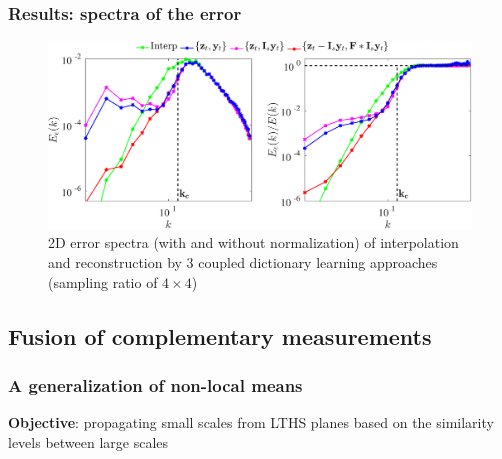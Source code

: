 \documentclass{beamer}
\begin{document}
\begin{frame}
	\frametitle{Results: spectra of the error} 

	\begin{figure}
		\centering
		\includegraphics[width=\textwidth]{./figures/DL/errspectra2d_nonnormalized_normalized_timespacing_06_spacespacing_04.eps}
		\caption*{2D error spectra (with and without normalization) of interpolation and reconstruction by 3 coupled dictionary learning approaches (sampling ratio of $ 4 \times 4 $)}
	\end{figure}
\end{frame}

\subsection{Fusion of complementary measurements}		
\begin{frame}
\frametitle{A generalization of non-local means}	
	\begin{tcolorbox}[colback=red!5!white,colframe=red!75!black]	
		\textbf{Objective}: propagating small scales from LTHS planes based on the similarity levels between large scales 
 	\end{tcolorbox}
 	\vfill
	\centering
\end{frame}
\end{document}

